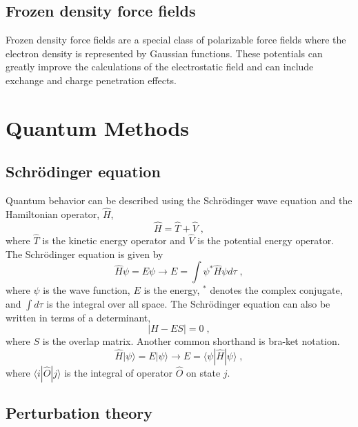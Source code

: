 \documentclass[12pt]{report}
\begin{document}
\subsection{Frozen density force fields}

Frozen density force fields are a special class of polarizable force fields
where the electron density is represented by Gaussian functions. These
potentials can greatly improve the calculations of the electrostatic field and
can include exchange and charge penetration effects.

\FloatBarrier

\section{Quantum Methods}

\subsection{Schr\"{o}dinger equation}

Quantum behavior can be described using the Schr\"{o}dinger wave equation and
the Hamiltonian operator, $\hat H$,
\begin{equation}
 \hat H = \hat T + \hat V \; ,
\end{equation}
where $\hat T$ is the kinetic energy operator and $\hat V$ is the potential
energy operator. The Schr\"{o}dinger equation is given by
\begin{equation}
 \hat H\psi = E\psi \to E = \int \psi^*\hat H\psi d\tau \; ,
\end{equation}
where $\psi$ is the wave function, $E$ is the energy, $^*$ denotes the complex
conjugate, and $\int d\tau$ is the integral over all space. The
Schr\"{o}dinger equation can also be written in terms of a determinant,
\begin{equation}
 |H-ES| = 0 \; ,
\end{equation}
where $S$ is the overlap matrix. Another common shorthand is bra-ket notation.
\begin{equation}
 \hat H|\psi\rangle = E|\psi\rangle \to E=\langle\psi|\hat H|\psi\rangle \; ,
\end{equation}
where $\langle i|\hat O|j\rangle$ is the integral of operator $\hat O$ on
state $j$.

\subsection{Perturbation theory}
\end{document}
